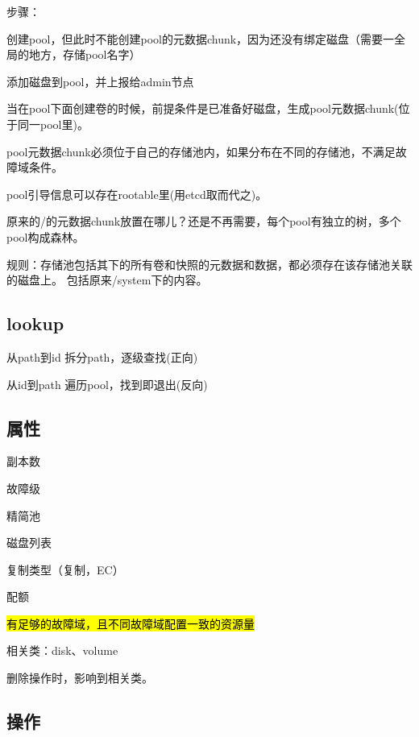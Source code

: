 
步骤：
\begin{enumbox}
\item 创建pool，但此时不能创建pool的元数据chunk，因为还没有绑定磁盘（需要一全局的地方，存储pool名字）
\item 添加磁盘到pool，并上报给admin节点
\item 当在pool下面创建卷的时候，前提条件是已准备好磁盘，生成pool元数据chunk(位于同一pool里)。
\end{enumbox}

pool元数据chunk必须位于自己的存储池内，如果分布在不同的存储池，不满足故障域条件。

pool引导信息可以存在rootable里(用etcd取而代之)。

原来的/的元数据chunk放置在哪儿？还是不再需要，每个pool有独立的树，多个pool构成森林。

规则：存储池包括其下的所有卷和快照的元数据和数据，都必须存在该存储池关联的磁盘上。
包括原来/system下的内容。

\subsection{lookup}

\begin{compactitem}
\item 从path到id 拆分path，逐级查找(正向)
\item 从id到path 遍历pool，找到即退出(反向)
\end{compactitem}

\subsection{属性}

\begin{enumbox}
\item 副本数
\item 故障级
\item 精简池
\item 磁盘列表
\item 复制类型（复制，EC）
\item 配额
\item \hl{有足够的故障域，且不同故障域配置一致的资源量}
\end{enumbox}

相关类：disk、volume

删除操作时，影响到相关类。

\subsection{操作}

